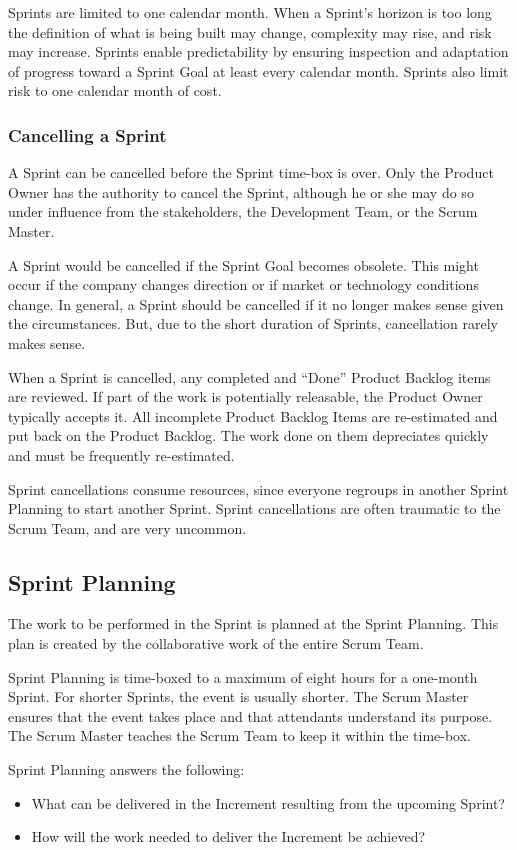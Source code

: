 Sprints are limited to one calendar month. When a Sprint's horizon is too long the definition of
what is being built may change, complexity may rise, and risk may increase. Sprints enable
predictability by ensuring inspection and adaptation of progress toward a Sprint Goal at least
every calendar month. Sprints also limit risk to one calendar month of cost.

\subsubsection{Cancelling a Sprint}
A Sprint can be cancelled before the Sprint time-box is over. Only the Product Owner has the
authority to cancel the Sprint, although he or she may do so under influence from the
stakeholders, the Development Team, or the Scrum Master.

A Sprint would be cancelled if the Sprint Goal becomes obsolete. This might occur if the
company changes direction or if market or technology conditions change. In general, a Sprint
should be cancelled if it no longer makes sense given the circumstances. But, due to the short
duration of Sprints, cancellation rarely makes sense.

When a Sprint is cancelled, any completed and ``Done'' Product Backlog items are reviewed. If
part of the work is potentially releasable, the Product Owner typically accepts it. All incomplete
Product Backlog Items are re-estimated and put back on the Product Backlog. The work done on
them depreciates quickly and must be frequently re-estimated.

Sprint cancellations consume resources, since everyone regroups in another Sprint Planning to
start another Sprint. Sprint cancellations are often traumatic to the Scrum Team, and are very
uncommon.

\subsection{Sprint Planning}
The work to be performed in the Sprint is planned at the Sprint Planning. This plan is created by
the collaborative work of the entire Scrum Team.

Sprint Planning is time-boxed to a maximum of eight hours for a one-month Sprint. For shorter
Sprints, the event is usually shorter. The Scrum Master ensures that the event takes place and
that attendants understand its purpose. The Scrum Master teaches the Scrum Team to keep it
within the time-box.

Sprint Planning answers the following:
\begin{itemize}
\item What can be delivered in the Increment resulting from the upcoming Sprint?
\item How will the work needed to deliver the Increment be achieved?
\end{itemize}

